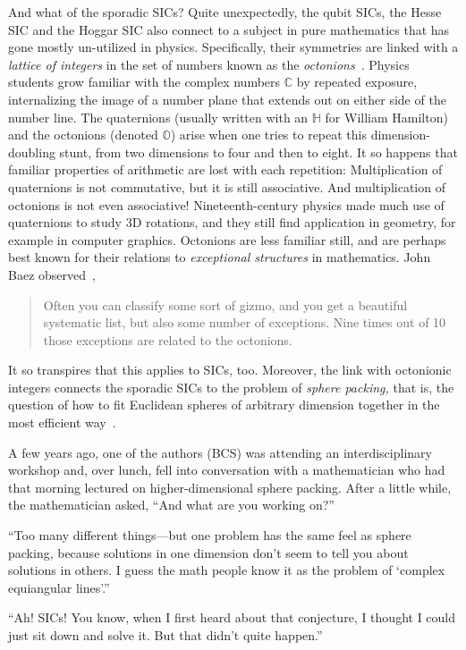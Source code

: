 \documentclass[aps,pra,superscriptaddress,12pt,tightenlines,nofootinbib]{revtex4-2}
\begin{document}
And what of the sporadic SICs?  Quite unexpectedly, the qubit SICs, the Hesse SIC and the Hoggar SIC
also connect to a subject in pure mathematics that has gone mostly un-utilized in physics.
Specifically, their symmetries are linked with a {\it lattice of integers\/} in
the set of numbers known as the {\it octonions}~\cite{stacey-sporadic}.
Physics students grow familiar with the complex numbers $\mathbb{C}$
by repeated exposure, internalizing the image of a number plane that
extends out on either side of the number line.  The quaternions
(usually written with an $\mathbb{H}$ for William Hamilton) and the octonions (denoted $\mathbb{O}$) arise when one tries to repeat
this dimension-doubling stunt, from two dimensions to four and then to
eight.  It so happens that familiar properties of arithmetic are lost
with each repetition: Multiplication of quaternions is not
commutative, but it is still associative.  And multiplication of
octonions is not even associative!  Nineteenth-century physics made much use
of quaternions to study 3D rotations, and they still find application
in geometry, for example in computer graphics.  Octonions are less
familiar still, and are perhaps best known for their relations to {\it
  exceptional structures\/} in mathematics.  John Baez
observed~\cite{baez-plus},
\begin{quote}
\noindent  Often you can classify some sort of gizmo, and you get
  a beautiful systematic list, but also some number of
  exceptions. Nine times out of 10 those exceptions are related to the
  octonions.
\end{quote}
It so transpires that this applies to SICs, too.  Moreover, the link with octonionic integers connects the sporadic SICs to the problem of {\it sphere packing,} that is, the question of how to fit Euclidean spheres of arbitrary dimension together in the most efficient way~\cite{viazovska2016}.

A few years ago, one of the authors (BCS) was attending an
interdisciplinary workshop and, over lunch, fell into conversation
with a mathematician who had that morning lectured on
higher-dimensional sphere packing.  After a little while, the
mathematician asked, ``And what are you working on?''

``Too many different things---but one problem has the same feel as
sphere packing, because solutions in one dimension don't seem to tell
you about solutions in others.  I guess the math people know it as the
problem of `complex equiangular lines'.''

``Ah! SICs!  You know, when I first heard about that conjecture, I
thought I could just sit down and solve it.  But that didn't quite
happen.''
\end{document}
